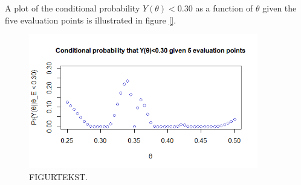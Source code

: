 A plot of the conditional probability $Y(\theta)<0.30$ as a function of $\theta$ given the five evaluation points is illustrated in figure \ref{}. 


\begin{figure}
    \centering
    \includegraphics[width=100mm]{2b.png}
    \caption{ FIGURTEKST. }
    \label{2b}
\end{figure}